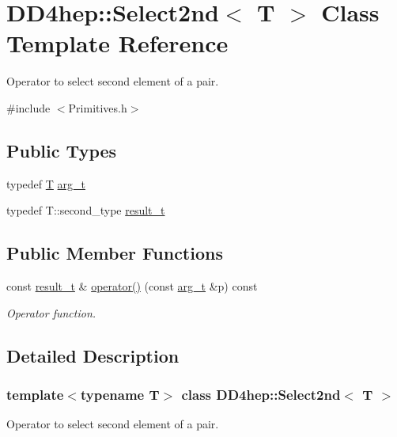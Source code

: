 \hypertarget{class_d_d4hep_1_1_select2nd}{
\section{DD4hep::Select2nd$<$ T $>$ Class Template Reference}
\label{class_d_d4hep_1_1_select2nd}
}


Operator to select second element of a pair.  


{\ttfamily \#include $<$Primitives.h$>$}\subsection*{Public Types}
\begin{DoxyCompactItemize}
\item 
typedef \hyperlink{class_t}{T} \hyperlink{class_d_d4hep_1_1_select2nd_a1159f763d3e02055e64e1c757c0e05c0}{arg\_\-t}
\item 
typedef T::second\_\-type \hyperlink{class_d_d4hep_1_1_select2nd_acfbf4d9607a113083ddcfa3b16385c2e}{result\_\-t}
\end{DoxyCompactItemize}
\subsection*{Public Member Functions}
\begin{DoxyCompactItemize}
\item 
const \hyperlink{class_d_d4hep_1_1_select2nd_acfbf4d9607a113083ddcfa3b16385c2e}{result\_\-t} \& \hyperlink{class_d_d4hep_1_1_select2nd_af28d9c81d9a43a766f4b31f754601f21}{operator()} (const \hyperlink{class_t}{arg\_\-t} \&p) const 
\begin{DoxyCompactList}\small\item\em Operator function. \item\end{DoxyCompactList}\end{DoxyCompactItemize}


\subsection{Detailed Description}
\subsubsection*{template$<$typename T$>$ class DD4hep::Select2nd$<$ T $>$}

Operator to select second element of a pair. 

